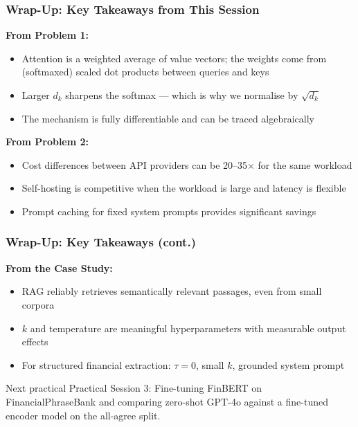 \documentclass[9pt,t]{beamer}
\begin{document}
\begin{frame}
\frametitle{Wrap-Up: Key Takeaways from This Session}

\textbf{From Problem 1:}
\begin{itemize}
  \item Attention is a weighted average of value vectors; the weights come from
        (softmaxed) scaled dot products between queries and keys
  \item Larger $d_k$ sharpens the softmax --- which is why we normalise by $\sqrt{d_k}$
  \item The mechanism is fully differentiable and can be traced algebraically
\end{itemize}

\medskip
\textbf{From Problem 2:}
\begin{itemize}
  \item Cost differences between API providers can be 20--35$\times$ for the same workload
  \item Self-hosting is competitive when the workload is large and latency is flexible
  \item Prompt caching for fixed system prompts provides significant savings
\end{itemize}
\end{frame}

\begin{frame}
\frametitle{Wrap-Up: Key Takeaways (cont.)}

\textbf{From the Case Study:}
\begin{itemize}
  \item RAG reliably retrieves semantically relevant passages, even from small corpora
  \item $k$ and temperature are meaningful hyperparameters with measurable output effects
  \item For structured financial extraction: $\tau = 0$, small $k$, grounded system prompt
\end{itemize}

\medskip
\begin{block}{Next practical}
Practical Session 3: Fine-tuning FinBERT on FinancialPhraseBank and comparing
zero-shot GPT-4o against a fine-tuned encoder model on the all-agree split.
\end{block}
\end{frame}
\end{document}
